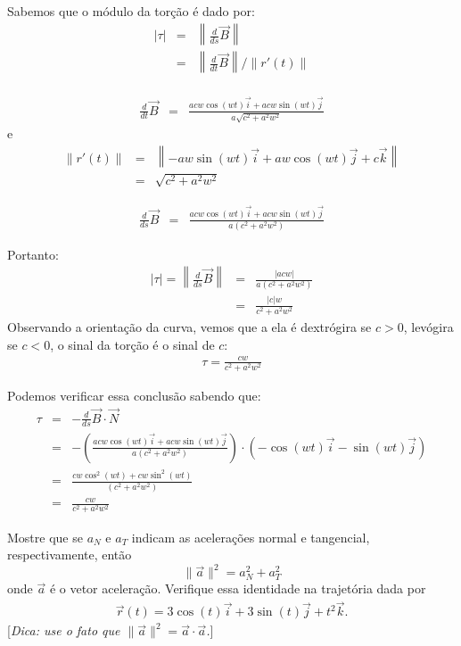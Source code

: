 \begin{resol}
Sabemos que o módulo da torção é dado por:
\begin{eqnarray*}
|\tau|&=&\left\|\frac{d}{ds}\vec{B}\right\|\\
&=& \left\|\frac{d}{dt}\vec{B} \right\|/\|r'(t)\|\\
\end{eqnarray*}

\begin{eqnarray*}
 \frac{d}{dt}\vec{B} 
&=&\frac{acw\cos(wt)\vec{i}+acw\sin(wt)\vec{j}}{a\sqrt{c^2+a^2w^2}}
\end{eqnarray*}
e
\begin{eqnarray*}
\|r'(t)\|&=&\left\|-aw\sin(wt)\vec{i}+aw\cos(wt)\vec{j}+c\vec{k}\right\|\\
&=&\sqrt{c^2+a^2w^2}
\end{eqnarray*}


\begin{eqnarray*}
 \frac{d}{ds}\vec{B} 
&=&\frac{acw\cos(wt)\vec{i}+acw\sin(wt)\vec{j}}{a(c^2+a^2w^2)}
\end{eqnarray*}

Portanto:
\begin{eqnarray*}
|\tau|=\left\|\frac{d}{ds}\vec{B}\right\|&=&
\frac{|acw|}{a(c^2+a^2w^2)}\\
&=&\frac{|c|w}{{c^2+a^2w^2}}
\end{eqnarray*}
Observando a orientação da curva, vemos que a ela é dextrógira se $c>0$, levógira se $c<0$, o sinal da torção é o sinal de $c$:
\begin{eqnarray*}
\tau=\frac{cw}{{c^2+a^2w^2}}
\end{eqnarray*}

Podemos verificar essa conclusão sabendo que:
\begin{eqnarray*}
\tau&=&-\frac{d}{ds}\vec{B}\cdot\vec{N}\\
&=&-\left(\frac{acw\cos(wt)\vec{i}+acw\sin(wt)\vec{j}}{a(c^2+a^2w^2)}\right)\cdot\left(-\cos(wt)\vec{i}-\sin(wt)\vec{j}\right)\\
&=&\frac{cw\cos^2(wt)+cw\sin^2(wt)}{(c^2+a^2w^2)}\\
&=&\frac{cw}{c^2+a^2w^2}
\end{eqnarray*}

\end{resol}

\begin{exeresol} Mostre que se $a_N$ e $a_T$ indicam as acelerações normal e tangencial, respectivamente, então
$$\|\vec{a}\|^2=a_N^2+a_T^2$$
onde $\vec{a}$ é o vetor aceleração. Verifique essa identidade na trajetória dada por
\begin{eqnarray*}
 \vec{r}(t)=3\cos (t) \vec{i} + 3\sin (t) \vec{j} +t^2\vec{k}.
\end{eqnarray*}
[{\it Dica: use o fato que $\|\vec{a}\|^2=\vec{a}\cdot\vec{a}$.}]
\end{exeresol}


